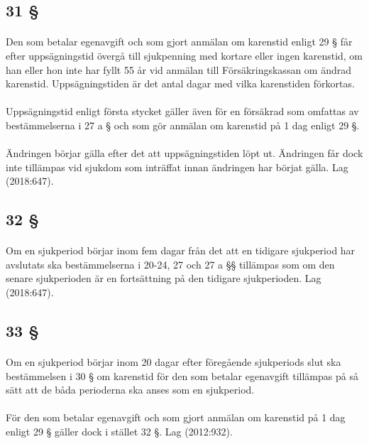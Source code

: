 \documentclass[a4paper,notitlepage,openany,10pt]{book}
\begin{document}
\subsection*{31 §}
\paragraph*{}
Den som betalar egenavgift och som gjort anmälan om karenstid enligt 29 § får efter uppsägningstid övergå till sjukpenning med kortare eller ingen karenstid, om han eller hon inte har fyllt 55 år vid anmälan till Försäkringskassan om ändrad karenstid. Uppsägningstiden är det antal dagar med vilka karenstiden förkortas.
\paragraph*{}
Uppsägningstid enligt första stycket gäller även för en försäkrad som omfattas av bestämmelserna i 27 a § och som gör anmälan om karenstid på 1 dag enligt 29 §.
\paragraph*{}
Ändringen börjar gälla efter det att uppsägningstiden löpt ut. Ändringen får dock inte tillämpas vid sjukdom som inträffat innan ändringen har börjat gälla.
Lag (2018:647).
\subsection*{32 §}
\paragraph*{}
Om en sjukperiod börjar inom fem dagar från det att en tidigare sjukperiod har avslutats ska bestämmelserna i 20-24, 27 och 27 a §§ tillämpas som om den senare sjukperioden är en fortsättning på den tidigare sjukperioden.
Lag (2018:647).
\subsection*{33 §}
\paragraph*{}
Om en sjukperiod börjar inom 20 dagar efter föregående sjukperiods slut ska bestämmelsen i 30 § om karenstid för den som betalar egenavgift tillämpas på så sätt att de båda perioderna ska anses som en sjukperiod.
\paragraph*{}
För den som betalar egenavgift och som gjort anmälan om karenstid på 1 dag enligt 29 § gäller dock i stället 32 §.
Lag (2012:932).
\end{document}
